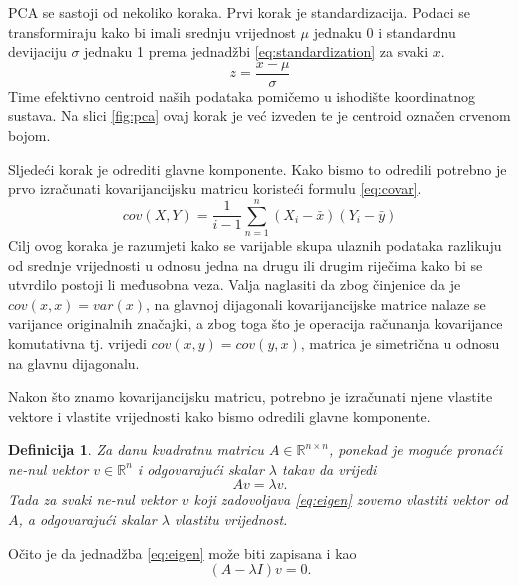 \documentclass[times, utf8, diplomski]{fer}
\newtheorem{definition}{Definicija}         %
\begin{document}
PCA se sastoji od nekoliko koraka.
Prvi korak je standardizacija. Podaci se transformiraju kako bi imali srednju vrijednost $\mu$ jednaku 0 i standardnu devijaciju $\sigma$ jednaku 1 prema jednadžbi \ref{eq:standardization} za svaki \(x\).
\begin{equation}
    z = \frac{x - \mu}{\sigma}
    \label{eq:standardization}
\end{equation}
Time efektivno centroid naših podataka pomičemo u ishodište koordinatnog sustava. Na slici \ref{fig:pca} ovaj korak je već izveden te je centroid označen crvenom bojom.

Sljedeći korak je odrediti glavne komponente. Kako bismo to odredili potrebno je prvo izračunati kovarijancijsku matricu koristeći formulu \ref{eq:covar}.
\begin{equation}
    cov(X, Y) = \frac{1}{i - 1}\sum_{n=1}^{n} (X_i - \bar{x})(Y_i - \bar{y})
    \label{eq:covar}
\end{equation}
Cilj ovog koraka je razumjeti kako se varijable skupa ulaznih podataka razlikuju od srednje vrijednosti u odnosu jedna na drugu ili drugim riječima kako bi se utvrdilo postoji li međusobna veza. Valja naglasiti da zbog činjenice da je $cov(x, x) = var(x)$, na glavnoj dijagonali kovarijancijske matrice nalaze se varijance originalnih značajki, a zbog toga što je operacija računanja kovarijance komutativna tj. vrijedi $cov(x,y) = cov(y, x)$, matrica je simetrična u odnosu na glavnu dijagonalu.

Nakon što znamo kovarijancijsku matricu, potrebno je izračunati njene vlastite vektore  i vlastite vrijednosti  kako bismo odredili glavne komponente.

\begin{definition}
    Za danu kvadratnu matricu $A \in \mathbb{R}^{n \times n}$, ponekad je moguće pronaći ne-nul vektor $v \in \mathbb{R}^n$ i odgovarajući skalar $\lambda$ takav da vrijedi
    \begin{equation}
        Av = \lambda v.
        \label{eq:eigen}
    \end{equation}
    Tada za svaki ne-nul vektor $v$ koji zadovoljava \ref{eq:eigen} zovemo vlastiti vektor od $A$, a odgovarajući skalar $\lambda$ vlastitu vrijednost.
\end{definition}
Očito je da jednadžba \ref{eq:eigen} može biti zapisana i kao
\begin{equation}
    (A - \lambda I)v = 0.
\end{equation}
\end{document}
